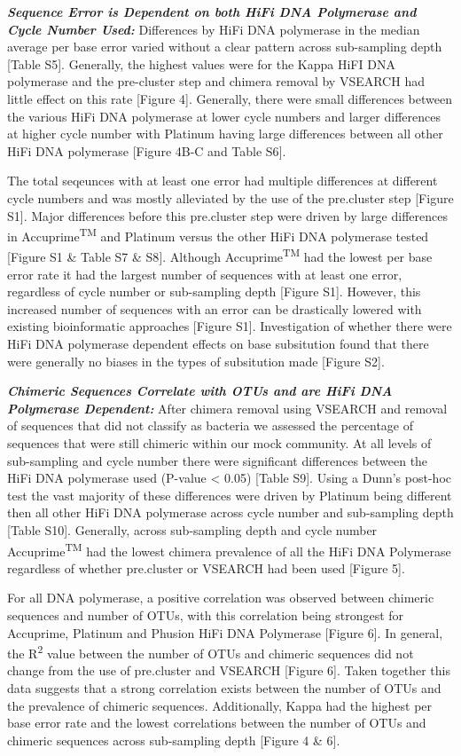 \documentclass[12pt,]{article}
\begin{document}
\textbf{\emph{Sequence Error is Dependent on both HiFi DNA Polymerase
and Cycle Number Used:}} Differences by HiFi DNA polymerase in the
median average per base error varied without a clear pattern across
sub-sampling depth {[}Table S5{]}. Generally, the highest values were
for the Kappa HiFI DNA polymerase and the pre-cluster step and chimera
removal by VSEARCH had little effect on this rate {[}Figure 4{]}.
Generally, there were small differences between the various HiFi DNA
polymerase at lower cycle numbers and larger differences at higher cycle
number with Platinum having large differences between all other HiFi DNA
polymerase {[}Figure 4B-C and Table S6{]}.

The total seqeunces with at least one error had multiple differences at
different cycle numbers and was mostly alleviated by the use of the
pre.cluster step {[}Figure S1{]}. Major differences before this
pre.cluster step were driven by large differences in
Accuprime\textsuperscript{TM} and Platinum versus the other HiFi DNA
polymerase tested {[}Figure S1 \& Table S7 \& S8{]}. Although
Accuprime\textsuperscript{TM} had the lowest per base error rate it had
the largest number of sequences with at least one error, regardless of
cycle number or sub-sampling depth {[}Figure S1{]}. However, this
increased number of sequences with an error can be drastically lowered
with existing bioinformatic approaches {[}Figure S1{]}. Investigation of
whether there were HiFi DNA polymerase dependent effects on base
subsitution found that there were generally no biases in the types of
subsitution made {[}Figure S2{]}.

\textbf{\emph{Chimeric Sequences Correlate with OTUs and are HiFi DNA
Polymerase Dependent:}} After chimera removal using VSEARCH and removal
of sequences that did not classify as bacteria we assessed the
percentage of sequences that were still chimeric within our mock
community. At all levels of sub-sampling and cycle number there were
significant differences between the HiFi DNA polymerase used (P-value
\textless{} 0.05) {[}Table S9{]}. Using a Dunn's post-hoc test the vast
majority of these differences were driven by Platinum being different
then all other HiFi DNA polymerase across cycle number and sub-sampling
depth {[}Table S10{]}. Generally, across sub-sampling depth and cycle
number Accuprime\textsuperscript{TM} had the lowest chimera prevalence
of all the HiFi DNA Polymerase regardless of whether pre.cluster or
VSEARCH had been used {[}Figure 5{]}.

For all DNA polymerase, a positive correlation was observed between
chimeric sequences and number of OTUs, with this correlation being
strongest for Accuprime, Platinum and Phusion HiFi DNA Polymerase
{[}Figure 6{]}. In general, the R\textsuperscript{2} value between the
number of OTUs and chimeric sequences did not change from the use of
pre.cluster and VSEARCH {[}Figure 6{]}. Taken together this data
suggests that a strong correlation exists between the number of OTUs and
the prevalence of chimeric sequences. Additionally, Kappa had the
highest per base error rate and the lowest correlations between the
number of OTUs and chimeric sequences across sub-sampling depth
{[}Figure 4 \& 6{]}.
\end{document}
